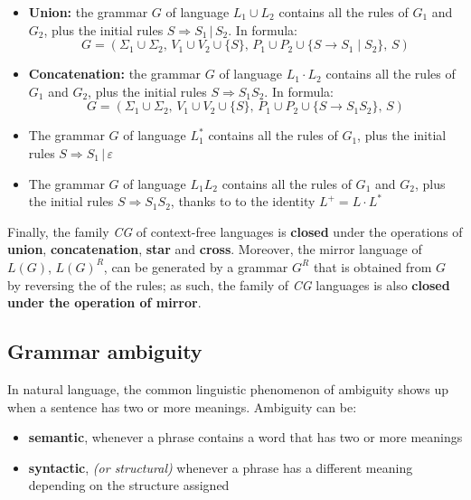 \documentclass[english]{article}
\begin{document}
\begin{itemize}
  \item \textbf{Union:} the grammar \(G\) of language \(L_1 \cup L_2\) contains all the rules of \(G_1\) and \(G_2\), plus the initial rules \(S \Rightarrow S_1 \,|\, S_2 \). In formula:
        \[ G = \left(\Sigma_1 \cup \Sigma_2, \, V_1 \cup V_2 \cup \{S\}, \, P_1 \cup P_2 \cup \{S \rightarrow S_1 \mid S_2\}, \, S \right) \]
  \item \textbf{Concatenation:} the grammar \(G\) of language \(L_1 \cdot L_2\) contains all the rules of \(G_1\) and \(G_2\), plus the initial rules \(S \Rightarrow S_1 S_2\). In formula:
        \[ G = \left(\Sigma_1 \cup \Sigma_2, \, V_1 \cup V_2 \cup \{S\},  \,P_1 \cup P_2 \cup \{S \rightarrow S_1 S_2\}, \, S \right) \]
  \item The grammar \(G\) of language \(L_1^\ast\) contains all the rules of \(G_1\), plus the initial rules \(S \Rightarrow S_1 \,|\, \varepsilon\)
  \item The grammar \(G\) of language \(L_1  L_2\) contains all the rules of \(G_1\) and \(G_2\), plus the initial rules \(S \Rightarrow S_1 S_2\), thanks to to the identity \(L^+ = L \cdot L^\ast\)
\end{itemize}

Finally, the family \textit{CG} of context-free languages is \textbf{closed} under the operations of \textbf{union}, \textbf{concatenation}, \textbf{star} and \textbf{cross}.
Moreover, the mirror language of \(L(G)\), \(L(G)^R\), can be generated by a grammar \(G^R\) that is obtained from \(G\) by reversing the \RP of the rules; as such, the family of \textit{CG} languages is also \textbf{closed under the operation of mirror}.

\subsection{Grammar ambiguity}
\label{sec:grammar-ambiguity}

In natural language, the common linguistic phenomenon of ambiguity shows up when a sentence has two or more meanings.
Ambiguity can be:

\begin{itemize}
  \item \textbf{semantic}, whenever a phrase contains a word that has two or more meanings
  \item \textbf{syntactic}, \textit{(or structural)} whenever a phrase has a different meaning depending on the structure assigned
\end{itemize}
\end{document}
